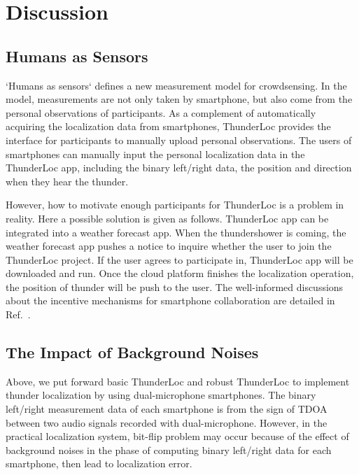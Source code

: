 \section{Discussion}

\subsection{Humans as Sensors}

`Humans as sensors` deﬁnes a new measurement model for crowdsensing. In the model, measurements are
not only taken by smartphone, but also come from the personal observations of participants. 
As a complement of automatically acquiring the localization data from smartphones, ThunderLoc provides the interface for participants to manually upload personal observations.
The users of smartphones can manually input the personal localization data in the ThunderLoc app, 
including the binary left/right data, the position and direction when they hear the thunder.

However, how to motivate enough participants for ThunderLoc is a problem in reality. 
Here a possible solution is given as follows. ThunderLoc app can be integrated into a weather forecast app. When the thundershower is coming, 
the weather forecast app pushes a notice to inquire whether the user to join the ThunderLoc project. 
If the user agrees to participate in, ThunderLoc app will be downloaded and run. Once the cloud platform finishes the localization operation,
the position of thunder will be push to the user. 
The well-informed discussions about the incentive mechanisms for smartphone collaboration are detailed in Ref.~\cite{duan2012incentive}.


\subsection{The Impact of Background Noises}
Above, we put forward basic ThunderLoc and robust ThunderLoc to implement thunder localization by using dual-microphone smartphones.
The binary left/right measurement data of each smartphone is from the sign of TDOA between two audio signals recorded with dual-microphone. 
However, in the practical localization system, bit-flip problem may occur because of the effect of background noises in the phase of computing binary left/right data for each smartphone,
then lead to localization error.


